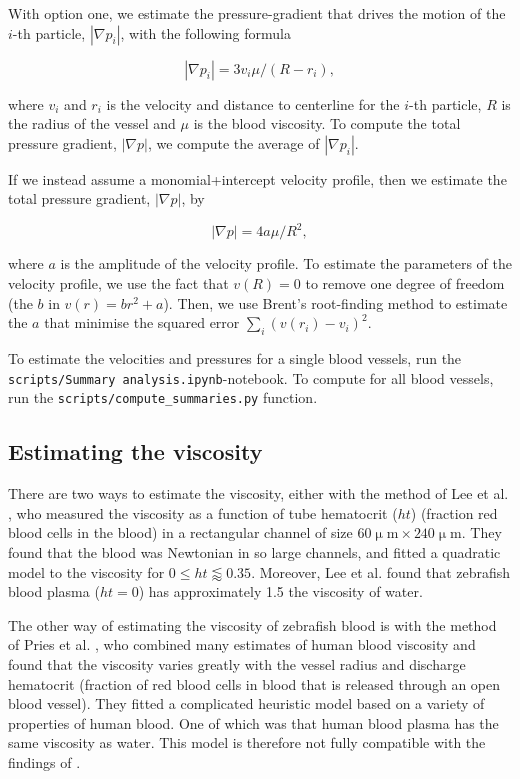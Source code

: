 \documentclass{article}
\begin{document}
With option one, we estimate the pressure-gradient that drives the motion of the $i$-th particle, $|\nabla p_i|$, with the following formula

\begin{equation}
    |\nabla p_i| = 3 v_i \mu / (R - r_i),
\end{equation}

where $v_i$ and $r_i$ is the velocity and distance to centerline for the $i$-th particle, $R$ is the radius of the vessel and $\mu$ is the blood viscosity. To compute the total pressure gradient, $|\nabla p|$, we compute the average of $|\nabla p_i|$.

If we instead assume a monomial+intercept velocity profile, then we estimate the total pressure gradient, $|\nabla p|$, by

\begin{equation}
    |\nabla p| = 4 a \mu / R^2,
\end{equation}

where $a$ is the amplitude of the velocity profile. To estimate the parameters of the velocity profile, we use the fact that $v(R) = 0$ to remove one degree of freedom (the $b$ in $v(r) = b r^2 + a$). Then, we use Brent's root-finding method \cite{brent1973algorithms,virtanen2020scipy} to estimate the $a$ that minimise the squared error $\sum_i (v(r_i) - v_i)^2$.

To estimate the velocities and pressures for a single blood vessels, run the \texttt{scripts/Summary analysis.ipynb}-notebook. To compute for all blood vessels, run the \texttt{scripts/compute\_summaries.py} function.

\subsection{Estimating the viscosity}
There are two ways to estimate the viscosity, either with the method of Lee et al. \cite{lee2017rapid}, who measured the viscosity as a function of tube hematocrit ($ht$) (fraction red blood cells in the blood) in a rectangular channel of size $60\upmu \text{m} \times 240 \upmu \text{m}$. They found that the blood was Newtonian in so large channels, and fitted a quadratic model to the viscosity for $0 \leq ht \lessapprox 0.35$. Moreover, Lee et al. found that zebrafish blood plasma ($ht=0$) has approximately 1.5 the viscosity of water.

The other way of estimating the viscosity of zebrafish blood is with the method of Pries et al. \cite{pries1992blood}, who combined many estimates of human blood viscosity and found that the viscosity varies greatly with the vessel radius and discharge hematocrit (fraction of red blood cells in blood that is released through an open blood vessel). They fitted a complicated heuristic model based on a variety of properties of human blood. One of which was that human blood plasma has the same viscosity as water. This model is therefore not fully compatible with the findings of \cite{lee2017rapid}.
\end{document}
